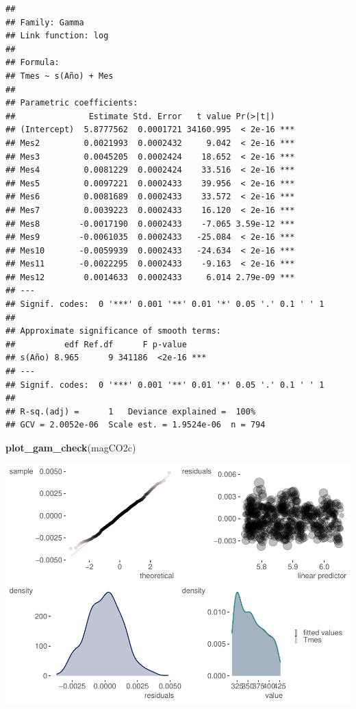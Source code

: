 \documentclass[12pt,a4paper,]{book}
\newenvironment{Shaded}{\begin{snugshade}}{\end{snugshade}}
\newcommand{\FunctionTok}[1]{\textcolor[rgb]{0.13,0.29,0.53}{\textbf{#1}}}
\newcommand{\NormalTok}[1]{#1}
\numberwithin{dummy}{section}
\theoremstyle{ocrenumbox}
\theoremstyle{blacknumex}
\theoremstyle{blacknumbox}
\theoremstyle{ocrenum}
\theoremstyle{ocrenum}
\begin{document}
\begin{verbatim}
## 
## Family: Gamma 
## Link function: log 
## 
## Formula:
## Tmes ~ s(Año) + Mes
## 
## Parametric coefficients:
##               Estimate Std. Error   t value Pr(>|t|)    
## (Intercept)  5.8777562  0.0001721 34160.995  < 2e-16 ***
## Mes2         0.0021993  0.0002432     9.042  < 2e-16 ***
## Mes3         0.0045205  0.0002424    18.652  < 2e-16 ***
## Mes4         0.0081229  0.0002424    33.516  < 2e-16 ***
## Mes5         0.0097221  0.0002433    39.956  < 2e-16 ***
## Mes6         0.0081689  0.0002433    33.572  < 2e-16 ***
## Mes7         0.0039223  0.0002433    16.120  < 2e-16 ***
## Mes8        -0.0017190  0.0002433    -7.065 3.59e-12 ***
## Mes9        -0.0061035  0.0002433   -25.084  < 2e-16 ***
## Mes10       -0.0059939  0.0002433   -24.634  < 2e-16 ***
## Mes11       -0.0022295  0.0002433    -9.163  < 2e-16 ***
## Mes12        0.0014633  0.0002433     6.014 2.79e-09 ***
## ---
## Signif. codes:  0 '***' 0.001 '**' 0.01 '*' 0.05 '.' 0.1 ' ' 1
## 
## Approximate significance of smooth terms:
##          edf Ref.df      F p-value    
## s(Año) 8.965      9 341186  <2e-16 ***
## ---
## Signif. codes:  0 '***' 0.001 '**' 0.01 '*' 0.05 '.' 0.1 ' ' 1
## 
## R-sq.(adj) =      1   Deviance explained =  100%
## GCV = 2.0052e-06  Scale est. = 1.9524e-06  n = 794
\end{verbatim}

\begin{Shaded}
\begin{Highlighting}[]
\FunctionTok{plot\_gam\_check}\NormalTok{(magCO2c)}
\end{Highlighting}
\end{Shaded}

\begin{center}\includegraphics[width=0.95\linewidth]{figurasR/unnamed-chunk-29-1} \end{center}
\end{document}
